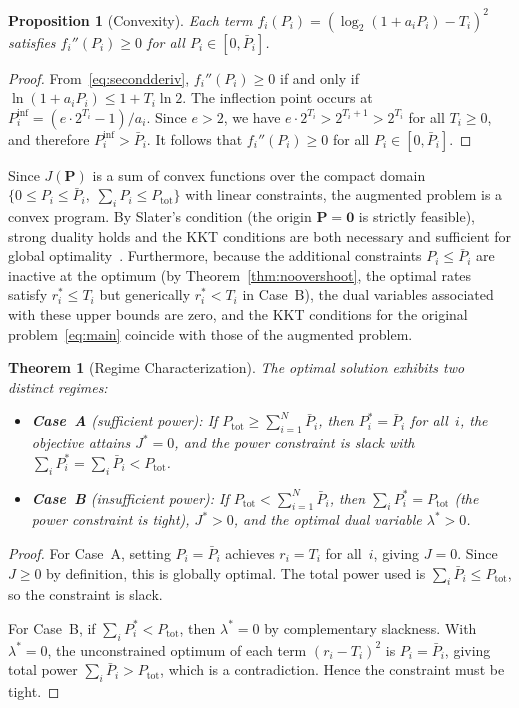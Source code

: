 \documentclass[journal]{IEEEtran}
\newtheorem{theorem}{Theorem}
\newtheorem{proposition}{Proposition}
\begin{document}
\begin{proposition}[Convexity]
\label{prop:convexity}
Each term $f_i(P_i) = (\log_2(1 + a_i P_i) - T_i)^2$ satisfies $f_i''(P_i) \ge 0$ for all $P_i \in [0, \bar{P}_i]$.
\end{proposition}

\begin{proof}
From~\eqref{eq:secondderiv}, $f_i''(P_i) \ge 0$ if and only if $\ln(1 + a_i P_i) \le 1 + T_i \ln 2$.
The inflection point occurs at $P_i^{\mathrm{inf}} = (e \cdot 2^{T_i} - 1)/a_i$.
Since $e > 2$, we have $e \cdot 2^{T_i} > 2^{T_i+1} > 2^{T_i}$ for all $T_i \ge 0$, and therefore $P_i^{\mathrm{inf}} > \bar{P}_i$.
It follows that $f_i''(P_i) \ge 0$ for all $P_i \in [0, \bar{P}_i]$.
\end{proof}

Since $J(\bm{P})$ is a sum of convex functions over the compact domain $\{0 \le P_i \le \bar{P}_i,\; \sum_i P_i \le P_{\mathrm{tot}}\}$ with linear constraints, the augmented problem is a convex program.
By Slater's condition (the origin $\bm{P} = \bm{0}$ is strictly feasible), strong duality holds and the KKT conditions are both necessary and sufficient for global optimality~\cite{boyd2004convex}.
Furthermore, because the additional constraints $P_i \le \bar{P}_i$ are inactive at the optimum (by Theorem~\ref{thm:noovershoot}, the optimal rates satisfy $r_i^* \le T_i$ but generically $r_i^* < T_i$ in Case~B), the dual variables associated with these upper bounds are zero, and the KKT conditions for the original problem~\eqref{eq:main} coincide with those of the augmented problem.

\begin{theorem}[Regime Characterization]
\label{thm:regimes}
The optimal solution exhibits two distinct regimes:
\begin{itemize}
\item \textbf{Case~A} (sufficient power): If $P_{\mathrm{tot}} \ge \sum_{i=1}^{N} \bar{P}_i$, then $P_i^* = \bar{P}_i$ for all~$i$, the objective attains $J^* = 0$, and the power constraint is \emph{slack} with $\sum_i P_i^* = \sum_i \bar{P}_i < P_{\mathrm{tot}}$.
\item \textbf{Case~B} (insufficient power): If $P_{\mathrm{tot}} < \sum_{i=1}^{N} \bar{P}_i$, then $\sum_i P_i^* = P_{\mathrm{tot}}$ (the power constraint is tight), $J^* > 0$, and the optimal dual variable $\lambda^* > 0$.
\end{itemize}
\end{theorem}

\begin{proof}
For Case~A, setting $P_i = \bar{P}_i$ achieves $r_i = T_i$ for all~$i$, giving $J = 0$.
Since $J \ge 0$ by definition, this is globally optimal.
The total power used is $\sum_i \bar{P}_i \le P_{\mathrm{tot}}$, so the constraint is slack.

For Case~B, if $\sum_i P_i^* < P_{\mathrm{tot}}$, then $\lambda^* = 0$ by complementary slackness.
With $\lambda^* = 0$, the unconstrained optimum of each term $(r_i - T_i)^2$ is $P_i = \bar{P}_i$, giving total power $\sum_i \bar{P}_i > P_{\mathrm{tot}}$, which is a contradiction.
Hence the constraint must be tight.
\end{proof}
\end{document}
